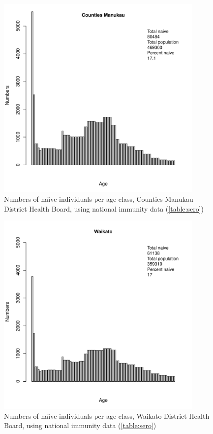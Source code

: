 \documentclass{article}
\begin{document}
\begin{figure}[H]
     \begin{center}
     \includegraphics[width=0.9\textwidth]{dhb4.pdf}
     \end{center}
     \caption{Numbers of na\"{\i}ve individuals per age class, Counties Manukau District Health Board, using national immunity data (\autoref{table:sero})}
     \label{fig:Counties_Manukau}
\end{figure}

\begin{figure}[H]
     \begin{center}
     \includegraphics[width=0.9\textwidth]{dhb5.pdf}
     \end{center}
     \caption{Numbers of na\"{\i}ve individuals per age class, Waikato District Health Board, using national immunity data (\autoref{table:sero})}
     \label{fig:Waikato}
\end{figure}
\end{document}
